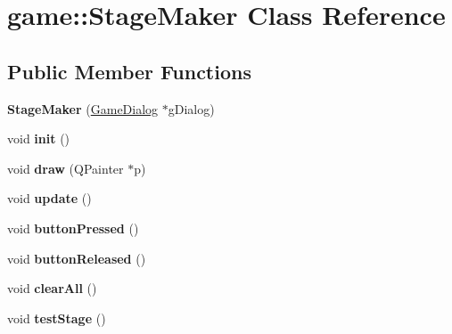 \hypertarget{classgame_1_1StageMaker}{}\section{game\+:\+:Stage\+Maker Class Reference}
\label{classgame_1_1StageMaker}
\subsection*{Public Member Functions}
\begin{DoxyCompactItemize}
\item 
\mbox{\label{classgame_1_1StageMaker_af1b6aa7edf5d213a4d3cf5d778f6b495}} 
{\bfseries Stage\+Maker} (\hyperlink{classgame_1_1GameDialog}{Game\+Dialog} $\ast$g\+Dialog)
\item 
\mbox{\label{classgame_1_1StageMaker_ad871b4aea521ed921c3f4b06041d1085}} 
void {\bfseries init} ()
\item 
\mbox{\label{classgame_1_1StageMaker_a84c160105ae30fb7537880a7c4011a86}} 
void {\bfseries draw} (Q\+Painter $\ast$p)
\item 
\mbox{\label{classgame_1_1StageMaker_a6e08f5b6ff467119e3e5f576ab2195b7}} 
void {\bfseries update} ()
\item 
\mbox{\label{classgame_1_1StageMaker_ab2b138692289443cb436c517783adbe7}} 
void {\bfseries button\+Pressed} ()
\item 
\mbox{\label{classgame_1_1StageMaker_a1ac9a3b373bc78e1d504ed20347fd190}} 
void {\bfseries button\+Released} ()
\item 
\mbox{\label{classgame_1_1StageMaker_aed57e4d242bce8bc2e57f446122eaea0}} 
void {\bfseries clear\+All} ()
\item 
\mbox{\label{classgame_1_1StageMaker_a00bba225c35cac171f2dc2a13a2cad07}} 
void {\bfseries test\+Stage} ()
\end{DoxyCompactItemize}
